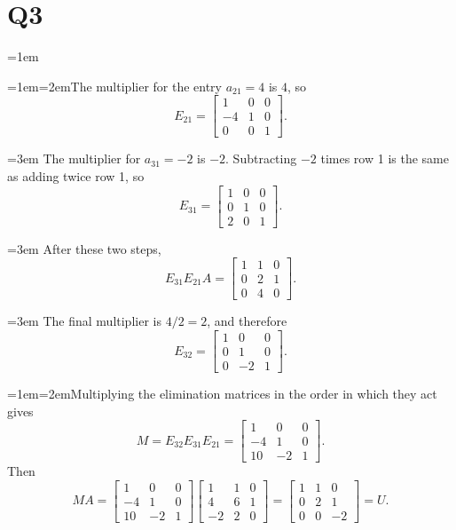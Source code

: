 \documentclass[11pt]{article}
\newcommand{\solutionquestion}[1]{\par\leftskip=0pt\section*{Q#1}\leftskip=1em}
\newcommand{\solutionpart}[1]{\par\smallskip\leftskip=1em\noindent\hangindent=2em\hangafter=1\makebox[1.5em][l]{\textbf{(#1)}}\hspace{0.5em}\ignorespaces}
\newcommand{\solutioncontinuation}{\par\leftskip=3em\noindent\ignorespaces}
\begin{document}
\solutionquestion{3}
\solutionpart{i}The multiplier for the entry $a_{21}=4$ is $4$, so
\[
E_{21}=\begin{bmatrix}
1&0&0\\
-4&1&0\\
0&0&1
\end{bmatrix}.
\]
\solutioncontinuation{} The multiplier for $a_{31}=-2$ is $-2$. Subtracting $-2$ times row 1 is the same as adding twice row 1, so
\[
E_{31}=\begin{bmatrix}
1&0&0\\
0&1&0\\
2&0&1
\end{bmatrix}.
\]
\solutioncontinuation{} After these two steps,
\[
E_{31}E_{21}A
=\begin{bmatrix}
1&1&0\\
0&2&1\\
0&4&0
\end{bmatrix}.
\]
\solutioncontinuation{} The final multiplier is $4/2=2$, and therefore
\[
E_{32}=\begin{bmatrix}
1&0&0\\
0&1&0\\
0&-2&1
\end{bmatrix}.
\]

\solutionpart{ii}Multiplying the elimination matrices in the order in which they act gives
\[
M=E_{32}E_{31}E_{21}
=\begin{bmatrix}
1&0&0\\
-4&1&0\\
10&-2&1
\end{bmatrix}.
\]
Then
\[
MA=
\begin{bmatrix}
1&0&0\\
-4&1&0\\
10&-2&1
\end{bmatrix}
\begin{bmatrix}
1&1&0\\
4&6&1\\
-2&2&0
\end{bmatrix}
=\begin{bmatrix}
1&1&0\\
0&2&1\\
0&0&-2
\end{bmatrix}
=U.
\]
\end{document}
